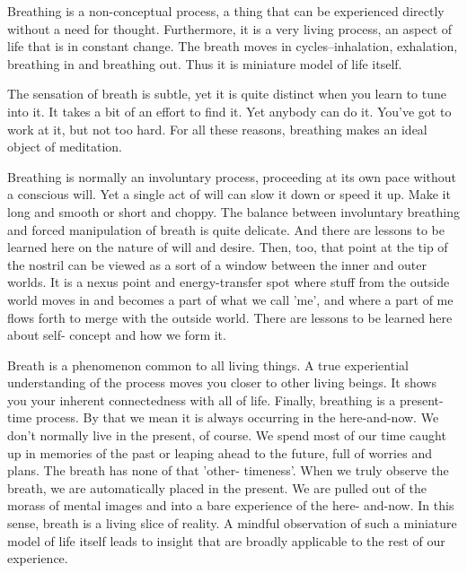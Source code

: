 Breathing is a non-conceptual process, a thing that can be experienced directly
without a need for thought. Furthermore, it is a very living process, an aspect
of life that is in constant change. The breath moves in cycles--inhalation,
exhalation, breathing in and breathing out. Thus it is miniature model of life
itself.

The sensation of breath is subtle, yet it is quite distinct when you learn to
tune into it. It takes a bit of an effort to find it. Yet anybody can do it.
You've got to work at it, but not too hard. For all these reasons, breathing
makes an ideal object of meditation.

Breathing is normally an involuntary process, proceeding at its own pace without
a conscious will. Yet a single act of will can slow it down or speed it up. Make
it long and smooth or short and choppy. The balance between involuntary
breathing and forced manipulation of breath is quite delicate. And there are
lessons to be learned here on the nature of will and desire. Then, too, that
point at the tip of the nostril can be viewed as a sort of a window between the
inner and outer worlds. It is a nexus point and energy-transfer spot where stuff
from the outside world moves in and becomes a part of what we call 'me', and
where a part of me flows forth to merge with the outside world. There are
lessons to be learned here about self- concept and how we form it.

Breath is a phenomenon common to all living things. A true experiential
understanding of the process moves you closer to other living beings. It shows
you your inherent connectedness with all of life. Finally, breathing is a
present-time process. By that we mean it is always occurring in the
here-and-now. We don't normally live in the present, of course. We spend most of
our time caught up in memories of the past or leaping ahead to the future, full
of worries and plans. The breath has none of that 'other- timeness'. When we
truly observe the breath, we are automatically placed in the present. We are
pulled out of the morass of mental images and into a bare experience of the
here- and-now. In this sense, breath is a living slice of reality. A mindful
observation of such a miniature model of life itself leads to insight that are
broadly applicable to the rest of our experience.


